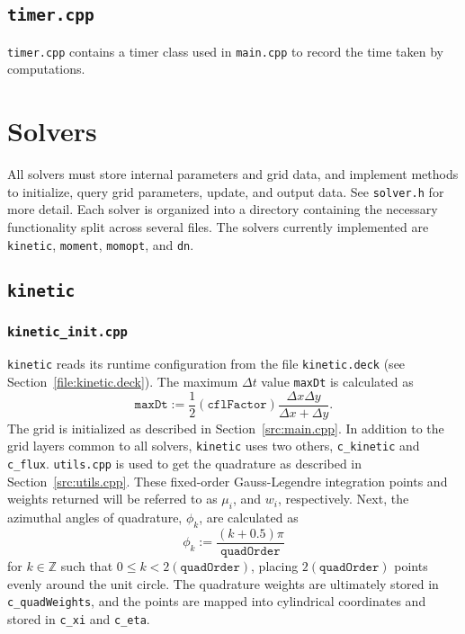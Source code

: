 \documentclass{article}
\newcommand{\main}{\texttt{main.cpp}\xspace}
\newcommand{\utils}{\texttt{utils.cpp}\xspace}
\newcommand{\timer}{\texttt{timer.cpp}\xspace}
\newcommand{\kineticdeck}{\texttt{kinetic.deck}\xspace}
\newcommand{\quadorder}{\ensuremath{\mathtt{quadOrder}}\xspace}
\newcommand{\dn}{\texttt{dn}\xspace}
\newcommand{\Z}{\ensuremath{\mathbb{Z}}\xspace}
\newcommand{\assign}{\ensuremath{\mathrel{\texttt{:=}}}}
\newcommand{\kinetic}{\texttt{kinetic}\xspace}
\newcommand{\moment}{\texttt{moment}\xspace}
\newcommand{\momopt}{\texttt{momopt}\xspace}
\begin{document}
\subsection{\timer}
\label{src:timer.cpp}
\timer contains a timer class used in \main to record the time taken by computations.

\section{Solvers}
\label{solver}
All solvers must store internal parameters and grid data, and implement methods to
initialize, query grid parameters, update, and output data. See \texttt{solver.h}
for more detail. Each solver is organized into a directory containing the necessary
functionality split across several files. The solvers currently implemented
are \kinetic, \moment, \momopt, and \dn.

\subsection{\kinetic}
\label{solver:kinetic}
\subsubsection{\texttt{kinetic\_init.cpp}}
\label{src:kinetic_init.cpp}
\kinetic reads its runtime configuration from the file \kineticdeck
(see Section~\ref{file:kinetic.deck}). The maximum $\Delta t$ value \texttt{maxDt}
is calculated as
\begin{equation} %
    \mathtt{maxDt} \assign \frac{1}{2} (\mathtt{cflFactor})
        \frac{\Delta x \Delta y}{\Delta x + \Delta y}.
\end{equation}
The grid is initialized as described in Section~\ref{src:main.cpp}. In addition to
the grid layers common to all solvers, \kinetic uses two others, \texttt{c\_kinetic}
and \texttt{c\_flux}. \utils is used
to get the quadrature as described in Section~\ref{src:utils.cpp}. These fixed-order
Gauss-Legendre integration points and weights returned will be referred to as $\mu_i$,
and $w_i$, respectively. Next, the
azimuthal angles of quadrature, $\phi_k$, are calculated as
\begin{equation}
    \phi_k \assign \frac{(k + 0.5)\pi}{\quadorder}
\end{equation}
for $k \in \Z$ such that $0 \leq k < 2(\quadorder)$,
placing $2(\quadorder)$ points evenly around the unit circle.
The quadrature weights are ultimately stored in
\texttt{c\_quadWeights}, and the points are mapped into cylindrical coordinates
and stored in \texttt{c\_xi} and \texttt{c\_eta}.
\end{document}
